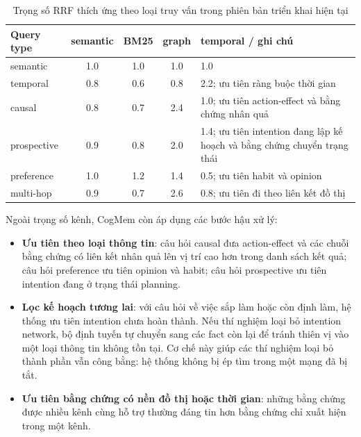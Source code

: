 \documentclass[../main.tex]{subfiles}
\begin{document}
\begin{table}[H]
\centering
\caption{Trọng số RRF thích ứng theo loại truy vấn trong phiên bản triển khai hiện tại}
\label{tab:adaptive_rrf}
\footnotesize
\begin{tabularx}{\linewidth}{@{}lcccY@{}}
\toprule
\textbf{Query type} & \textbf{semantic} & \textbf{BM25} & \textbf{graph} & \textbf{temporal / ghi chú} \\
\midrule
semantic & 1.0 & 1.0 & 1.0 & 1.0 \\
temporal & 0.8 & 0.6 & 0.8 & 2.2; ưu tiên ràng buộc thời gian \\
causal & 0.8 & 0.7 & 2.4 & 1.0; ưu tiên action-effect và bằng chứng nhân quả \\
prospective & 0.9 & 0.8 & 2.0 & 1.4; ưu tiên intention đang lập kế hoạch và bằng chứng chuyển trạng thái \\
preference & 1.0 & 1.2 & 1.4 & 0.5; ưu tiên habit và opinion \\
multi-hop & 0.9 & 0.7 & 2.6 & 0.8; ưu tiên đi theo liên kết đồ thị \\
\bottomrule
\end{tabularx}
\end{table}

Ngoài trọng số kênh, CogMem còn áp dụng các bước hậu xử lý:

\begin{itemize}
    \item \textbf{Ưu tiên theo loại thông tin}: câu hỏi causal đưa action-effect và các chuỗi bằng chứng có liên kết nhân quả lên vị trí cao hơn trong danh sách kết quả; câu hỏi preference ưu tiên opinion và habit; câu hỏi prospective ưu tiên intention đang ở trạng thái planning.
    \item \textbf{Lọc kế hoạch tương lai}: với câu hỏi về việc sắp làm hoặc còn định làm, hệ thống ưu tiên intention chưa hoàn thành. Nếu thí nghiệm loại bỏ intention network, bộ định tuyến tự chuyển sang các fact còn lại để tránh thiên vị vào một loại thông tin không tồn tại. Cơ chế này giúp các thí nghiệm loại bỏ thành phần vẫn công bằng: hệ thống không bị ép tìm trong một mạng đã bị tắt.
    \item \textbf{Ưu tiên bằng chứng có nền đồ thị hoặc thời gian}: những bằng chứng được nhiều kênh cùng hỗ trợ thường đáng tin hơn bằng chứng chỉ xuất hiện trong một kênh.
\end{itemize}
\end{document}
